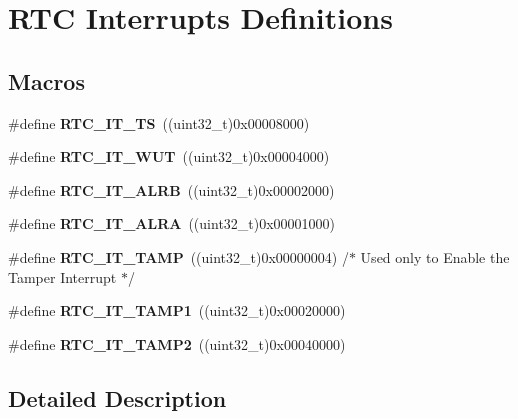 \hypertarget{group___r_t_c___interrupts___definitions}{}\section{R\+TC Interrupts Definitions}
\label{group___r_t_c___interrupts___definitions}
\subsection*{Macros}
\begin{DoxyCompactItemize}
\item 
\#define {\bfseries R\+T\+C\+\_\+\+I\+T\+\_\+\+TS}~((uint32\+\_\+t)0x00008000)\hypertarget{group___r_t_c___interrupts___definitions_ga2c4632667c515e366a79df6341d5f3d1}{}\label{group___r_t_c___interrupts___definitions_ga2c4632667c515e366a79df6341d5f3d1}

\item 
\#define {\bfseries R\+T\+C\+\_\+\+I\+T\+\_\+\+W\+UT}~((uint32\+\_\+t)0x00004000)\hypertarget{group___r_t_c___interrupts___definitions_gadc90686ace99992f4775c0198a1c6591}{}\label{group___r_t_c___interrupts___definitions_gadc90686ace99992f4775c0198a1c6591}

\item 
\#define {\bfseries R\+T\+C\+\_\+\+I\+T\+\_\+\+A\+L\+RB}~((uint32\+\_\+t)0x00002000)\hypertarget{group___r_t_c___interrupts___definitions_gaeb47520af65e995ddad232f3a846aba8}{}\label{group___r_t_c___interrupts___definitions_gaeb47520af65e995ddad232f3a846aba8}

\item 
\#define {\bfseries R\+T\+C\+\_\+\+I\+T\+\_\+\+A\+L\+RA}~((uint32\+\_\+t)0x00001000)\hypertarget{group___r_t_c___interrupts___definitions_ga0ba352559e4eb6a5430e1254851a0dfb}{}\label{group___r_t_c___interrupts___definitions_ga0ba352559e4eb6a5430e1254851a0dfb}

\item 
\#define {\bfseries R\+T\+C\+\_\+\+I\+T\+\_\+\+T\+A\+MP}~((uint32\+\_\+t)0x00000004) /$\ast$ Used only to Enable the Tamper Interrupt $\ast$/\hypertarget{group___r_t_c___interrupts___definitions_gada511402e0227932824cdc95711ebd55}{}\label{group___r_t_c___interrupts___definitions_gada511402e0227932824cdc95711ebd55}

\item 
\#define {\bfseries R\+T\+C\+\_\+\+I\+T\+\_\+\+T\+A\+M\+P1}~((uint32\+\_\+t)0x00020000)\hypertarget{group___r_t_c___interrupts___definitions_gaae1bc95e46b6951e45c4d857a6701a8a}{}\label{group___r_t_c___interrupts___definitions_gaae1bc95e46b6951e45c4d857a6701a8a}

\item 
\#define {\bfseries R\+T\+C\+\_\+\+I\+T\+\_\+\+T\+A\+M\+P2}~((uint32\+\_\+t)0x00040000)\hypertarget{group___r_t_c___interrupts___definitions_ga0d3023d6f144f75848c246a033a01485}{}\label{group___r_t_c___interrupts___definitions_ga0d3023d6f144f75848c246a033a01485}

\end{DoxyCompactItemize}


\subsection{Detailed Description}
